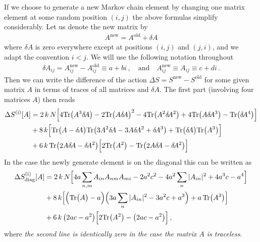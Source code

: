 \documentclass[10pt,a4paper]{article}
\newcommand{\RN}[1]{%
    \textup{\uppercase\expandafter{\romannumeral#1}}%
}
\newcommand{\Tr}{\mathrm{Tr}\vspace{-2pt}}
\newcommand{\deltaA}{\delta \! A}
\begin{document}
If we choose to generate a new Markov chain element by changing one
matrix element at some random position $(i,j)$ the above formulas simplify considerably.
Let us denote the new matrix by
\begin{align}
  A^{\mathrm{new}} = A^{\mathrm{old}} + \deltaA
\end{align}
where $\deltaA$ is zero everywhere except at positions $(i,j)$ and
$(j,i)$, and we adapt the convention $i<j$.
We will use the following notation throughout
\begin{align}
  \deltaA_{ij} = A_{ij}^{\mathrm{new}} - A_{ij}^{\mathrm{old}} \equiv a + bi \,,
  \quad \text{and} \quad
  A^{\mathrm{new}}_{ij} \equiv A_{ij} \equiv c + di \,.
\end{align}
Then we can write the difference of the action $\Delta S = S^{\mathrm{new}}
- S^{\mathrm{old}}$ for some given matrix $A$ in terms of traces of
all matrices and $\deltaA$.
The first part (involving four matrices $A$) then reads
\begin{align}
  \Delta S^{(\RN 1)} [A] &=
  2 \, k \, N
  \Big[
      4 \Tr \big( A^3 \deltaA   \big)
    - 2 \Tr \big( A   \deltaA   \big)^2
    - 4 \Tr \big( A^2 \deltaA^2 \big)
    + 4 \Tr \big( A   \deltaA^3 \big)
    -   \Tr \big(     \deltaA^4 \big)
  \Big]
  \nonumber \\
  &+ 8 \, k
  \Big[
    \Tr \big( A - \deltaA \big) \Tr \big( 3 A^2 \deltaA - 3 A \deltaA^2 + \deltaA^3 \big)
    + \Tr \big( \deltaA \big) \Tr \big( A^3 \big)
  \Big]
  \nonumber \\
  &+ 6  \, k  \, \Tr \big( 2 A \deltaA - \deltaA^2 \big)
  \Big[
    2 \Tr \big( A^2 \big)
    - \Tr \big( 2 A \deltaA - \deltaA^2 \big)
  \Big]
\end{align}
In the case the newly generate element is on the diagonal this can be written as
\begin{align}
  \Delta S^{(\RN{1})}_{\mathrm{diag}} [A] &=
    2 \, k \, N
    \Big[
      4 a \sum_{n,m} A_{in} A_{nm} A_{mi}
      - 2 a^2 c^2
      - 4 a^2 \sum_n |A_{in}|^2
      + 4 a^3 c
      - a^4
  \Big]
  \nonumber \\
  &+8 \, k
  \Big[
    \Big( \Tr \big( A \big) - a \Big)
    \Big(
      3 a \sum_n |A_{in}|^2
      - 3 a^2 c
      + a^3
    \Big)
    + a \, \Tr \big( A^3 \big)
  \Big]
  \nonumber \\
  &+6 \, k \, \big( 2 a c - a^2 \big)
  \Big[
    2 \Tr \big( A^2 \big)
    - \big( 2 a c - a^2 \big)
  \Big]
 \,,
\end{align}
where
\textit{the second line is identically zero in the case the matrix $A$ is traceless}.
\end{document}
